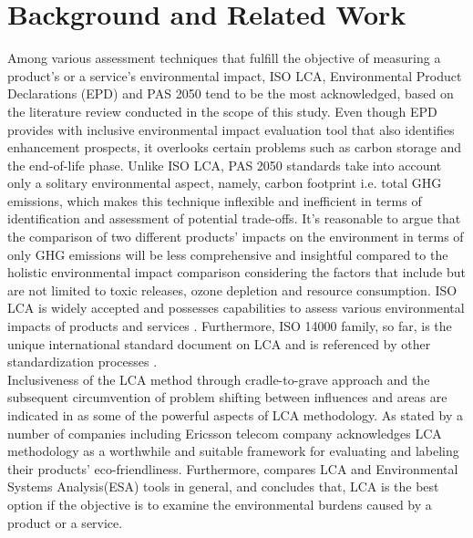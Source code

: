 \documentclass[3p,times,procedia]{elsarticle}
\begin{document}
\section{Background and Related Work} 

Among various assessment techniques that fulfill the objective of measuring a product's or a service's environmental impact, ISO LCA\cite{ISO140402006}, Environmental Product Declarations (EPD)\cite{iso2006environmental} and PAS 2050 \cite{pas20082050} tend to be the most acknowledged, based on the literature review conducted in the scope of this study. Even though EPD provides with inclusive environmental impact evaluation tool that also identifies enhancement prospects, it overlooks certain problems such as carbon storage and the end-of-life phase. Unlike ISO LCA, PAS 2050 standards take into account only a solitary environmental aspect, namely, carbon footprint i.e. total GHG emissions, which makes this technique inflexible and inefficient in terms of identification and assessment of potential trade-offs. It's reasonable to argue that the comparison of two different products' impacts on the environment in terms of only GHG emissions will be less comprehensive and insightful compared to the holistic environmental impact comparison considering the factors that include but are not limited to toxic releases, ozone depletion and resource consumption. ISO LCA is widely accepted and  possesses capabilities to assess various environmental impacts of products and services \cite{cooper2006life}. Furthermore,  ISO 14000 family, so far, is the unique international standard document on LCA and is referenced by other standardization processes \cite{finkbeiner201340s}.\\

Inclusiveness of the LCA method through cradle-to-grave approach and the subsequent circumvention of problem shifting between influences and areas are indicated in \cite{hermann2007assessing} as some of the powerful aspects of LCA methodology. As stated by \cite{guldbrandsson2012opportunities} a number of companies including Ericsson telecom company acknowledges LCA methodology as a worthwhile and suitable framework for evaluating and labeling their products' eco-friendliness. Furthermore, \cite{finnveden2000limitations} compares LCA and Environmental Systems Analysis(ESA) tools in general, and concludes that, LCA is the best option if the objective is to examine the environmental burdens caused by a product or a service.\\
\end{document}
